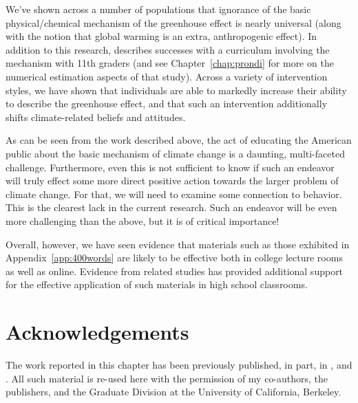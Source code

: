 We've shown across a number of populations that ignorance of the basic
physical/chemical mechanism of the greenhouse effect is nearly universal (along
with the notion that global warming is an extra, anthropogenic effect). In
addition to this research, \textcite{felipe_numerical_2012} describes successes
with a curriculum involving the mechanism with 11th graders (and see
Chapter~\ref{chap:prondi} for more on the numerical estimation aspects of that
study). Across a variety of intervention styles, we have shown that individuals
are able to markedly increase their ability to describe the greenhouse effect,
and that such an intervention additionally shifts climate-related beliefs and
attitudes.


As can be seen from the work described above, the act of educating the American
public about the basic mechanism of climate change is a daunting, multi-faceted
challenge. Furthermore, even this is not sufficient to know if such an endeavor will
truly effect some more direct positive action towards the larger problem of climate change.
For that, we will need to examine some connection to behavior. This is the
clearest lack in the current research. Such an endeavor will be even more
challenging than the above, but it is of critical importance! 

Overall, however, we have seen evidence that materials such as those exhibited
in Appendix~\ref{app:400words} are likely to be effective both in college
lecture rooms as well as online. Evidence from related studies has provided
additional support for the effective application of such materials in high school classrooms.



\section*{Acknowledgements}

The work reported in this chapter has been previously published, in part, in
\textcite{ranney_changing_2012,ranney_improving_2012_f}, and
\textcite{clark_knowledge_inpress}.  All such material is re-used here with the
permission of my co-authors, the publishers, and the Graduate Division at the
University of California, Berkeley.

